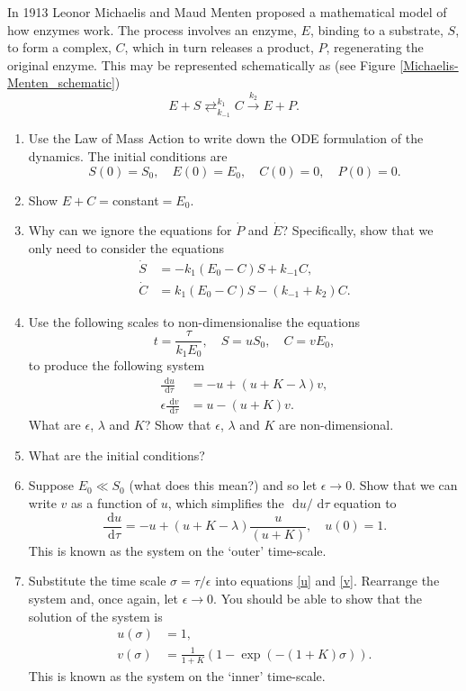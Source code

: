 \documentclass[]{article}
\newcommand{\bb}{\begin{equation}}
\newcommand{\ee}{\end{equation}}
\newcommand{\rd}{\text{ d}}
\newcommand{\see}[1]{(see Figure \ref{#1})}
\newcommand{\eqns}[2]{equations \eqref{#1} and \eqref{#2}}
\renewcommand{\l}{\left(}
\renewcommand{\r}{\right)}
\begin{document}
In 1913 Leonor Michaelis and Maud Menten proposed a mathematical model of how enzymes work. The process involves an enzyme, $E$, binding to a substrate, $S$, to form a complex, $C$, which in turn releases a product, $P$, regenerating the original enzyme. This may be represented schematically as \see{Michaelis-Menten_schematic}
\bb
E+S\mathrel{\mathop{\rightleftarrows}^{k_1}_{k_{-1}}}C\stackrel{k_2}{\rightarrow}E+P.
\ee
\begin{enumerate}
\item Use the Law of Mass Action to write down the ODE formulation of the dynamics. The initial conditions are
\bb 
S(0) = S_0,\quad E(0) = E_0,\quad C(0) = 0,\quad P(0) = 0.
\ee
\item Show $E+C=$constant$=E_0$.
\item Why can we ignore the equations for $\dot{P}$ and $\dot{E}$? Specifically, show that we only need to consider the equations
\begin{align}
\dot{S}&=-k_1(E_0-C)S + k_{-1}C,\\
\dot{C}&=k_1(E_0-C)S -( k_{-1}+k_2)C.
\end{align}
\item Use the following scales to non-dimensionalise the equations
\bb
t=\frac{\tau}{k_1E_0},\quad S=u S_0,\quad C=v E_0,
\ee
to produce the following system
\begin{align}
\frac{\rd u}{\rd \tau}&=-u+(u+K-\lambda)v,\label{u}\\
\epsilon\frac{\rd v}{\rd \tau}&=u-(u+K)v\label{v}.
\end{align}
What are $\epsilon$, $\lambda$ and $K$? Show that $\epsilon$, $\lambda$ and $K$ are non-dimensional.
\item What are the initial conditions?
\item Suppose $E_0\ll S_0$ (what does this mean?) and so let $\epsilon\rightarrow0$. Show that we can write $v$ as a function of $u$, which simplifies the $\rd u/\rd \tau$ equation to
\bb
\frac{\rd u}{\rd \tau}=-u+(u+K-\lambda)\frac{u}{(u+K)}, \quad u(0)=1.
\ee \label{Outer}
This is known as the system on the `outer' time-scale.
\item \label{Inner} Substitute the time scale $\sigma=\tau/\epsilon$ into \eqns{u}{v}. Rearrange the system and, once again, let $\epsilon \rightarrow 0$. You should be able to show that the solution of the system is
\begin{align}
u(\sigma)&=1,\nonumber\\
v(\sigma)&= \frac{1}{1+K}\l 1-\exp(-(1+K)\sigma)\r.
\end{align}
This is known as the system on the `inner' time-scale.
\end{enumerate}
\end{document}
